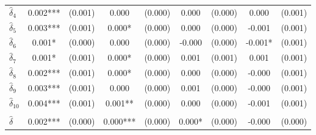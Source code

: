 {\begin{tabular}{l*{4}{cc}}
$\hat{\delta}_4$&       0.002***&     (0.001)&       0.000   &     (0.000)&       0.000   &     (0.000)&       0.000   &     (0.001)\\
$\hat{\delta}_5$&       0.003***&     (0.001)&       0.000*  &     (0.000)&       0.000   &     (0.000)&      -0.001   &     (0.001)\\
$\hat{\delta}_6$&       0.001*  &     (0.000)&       0.000   &     (0.000)&      -0.000   &     (0.000)&      -0.001*  &     (0.001)\\
$\hat{\delta}_7$&       0.001*  &     (0.001)&       0.000*  &     (0.000)&       0.001   &     (0.001)&       0.001   &     (0.001)\\
$\hat{\delta}_8$&       0.002***&     (0.001)&       0.000*  &     (0.000)&       0.000   &     (0.000)&      -0.000   &     (0.001)\\
$\hat{\delta}_9$&       0.003***&     (0.001)&       0.000   &     (0.000)&       0.001   &     (0.000)&      -0.000   &     (0.001)\\
$\hat{\delta}_{10}$&       0.004***&     (0.001)&       0.001** &     (0.000)&       0.000   &     (0.000)&      -0.001   &     (0.001)\\
\addlinespace&               &            &               &            &               &            &               &            \\
$\hat{\delta}$&       0.002***&     (0.000)&       0.000***&     (0.000)&       0.000*  &     (0.000)&      -0.000   &     (0.000)\\
\bottomrule
\end{tabular}
}
